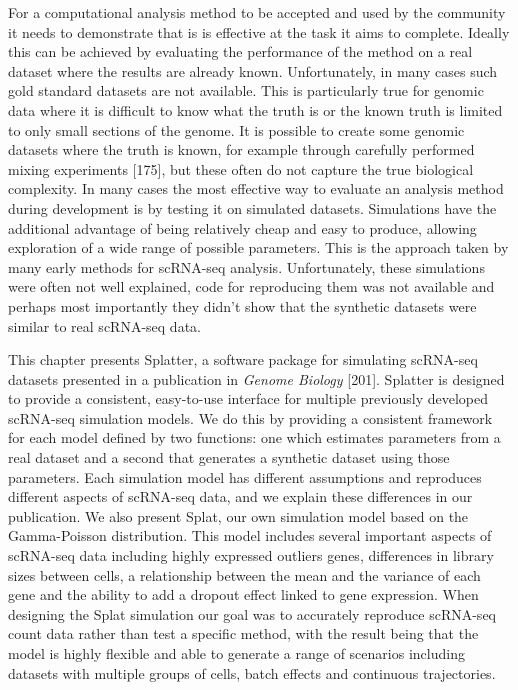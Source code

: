 \documentclass[11pt,a4paper,titlepage,twoside,openright]{style/unimelbthesis}
\theoremstyle{definition}
\theoremstyle{definition}
\theoremstyle{definition}
\theoremstyle{remark}
\begin{document}
\begin{mainmatter}
For a computational analysis method to be accepted and used by the community it needs to demonstrate that is is effective at the task it aims to complete. Ideally this can be achieved by evaluating the performance of the method on a real dataset where the results are already known. Unfortunately, in many cases such gold standard datasets are not available. This is particularly true for genomic data where it is difficult to know what the truth is or the known truth is limited to only small sections of the genome. It is possible to create some genomic datasets where the truth is known, for example through carefully performed mixing experiments {[}175{]}, but these often do not capture the true biological complexity. In many cases the most effective way to evaluate an analysis method during development is by testing it on simulated datasets. Simulations have the additional advantage of being relatively cheap and easy to produce, allowing exploration of a wide range of possible parameters. This is the approach taken by many early methods for scRNA-seq analysis. Unfortunately, these simulations were often not well explained, code for reproducing them was not available and perhaps most importantly they didn't show that the synthetic datasets were similar to real scRNA-seq data.

This chapter presents Splatter, a software package for simulating scRNA-seq datasets presented in a publication in \emph{Genome Biology} {[}201{]}. Splatter is designed to provide a consistent, easy-to-use interface for multiple previously developed scRNA-seq simulation models. We do this by providing a consistent framework for each model defined by two functions: one which estimates parameters from a real dataset and a second that generates a synthetic dataset using those parameters. Each simulation model has different assumptions and reproduces different aspects of scRNA-seq data, and we explain these differences in our publication. We also present Splat, our own simulation model based on the Gamma-Poisson distribution. This model includes several important aspects of scRNA-seq data including highly expressed outliers genes, differences in library sizes between cells, a relationship between the mean and the variance of each gene and the ability to add a dropout effect linked to gene expression. When designing the Splat simulation our goal was to accurately reproduce scRNA-seq count data rather than test a specific method, with the result being that the model is highly flexible and able to generate a range of scenarios including datasets with multiple groups of cells, batch effects and continuous trajectories.


\end{mainmatter}
\end{document}
